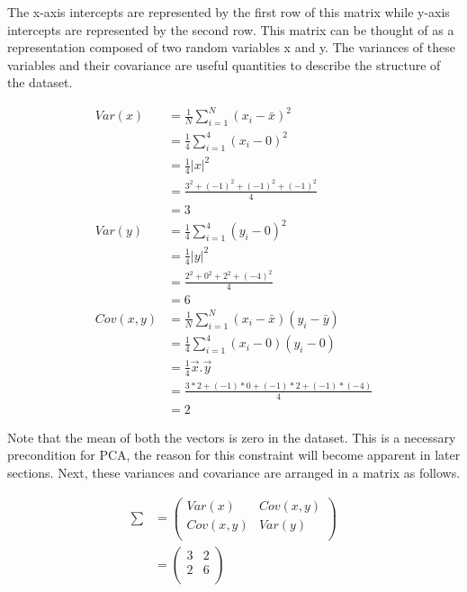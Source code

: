 \documentclass[11pt, a4paper]{article}
\begin{document}
The x-axis intercepts are represented by the first row of this matrix while y-axis intercepts are represented by the second row.
This matrix can be thought of as a representation composed of two random variables x and y. The variances of these variables and their covariance are useful quantities to describe the structure of the dataset.

\begin{align*}
	Var(x)    & = \frac{1}{N} \sum\limits_{i = 1}^N (x_i - \bar{x})^2              \\
	          & = \frac{1}{4} \sum\limits_{i = 1}^4 (x_i - 0)^2                    \\
	          & = \frac{1}{4} |x|^2                                                \\
	          & = \frac{3^2 + (-1)^ 2 + (-1)^2 + (-1)^2}{4}                        \\
	          & = 3                                                                \\
	Var(y)    & = \frac{1}{4} \sum\limits_{i = 1}^4 (y_i - 0)^2                    \\
	          & = \frac{1}{4} |y|^2                                                \\
	          & = \frac{2^2 + 0^ 2 + 2^2 + (-4)^2}{4}                              \\           
	          & = 6                                                                \\
	Cov(x, y) & = \frac{1}{N} \sum\limits_{i = 1}^N (x_i - \bar{x})(y_i - \bar{y}) \\
	          & = \frac{1}{4} \sum\limits_{i = 1}^4 (x_i - 0)(y_i - 0)             \\  
	          & = \frac{1}{4} \vec{x}.\vec{y}                                      \\
	          & = \frac{3*2 + (-1)*0 + (-1)*2 + (-1)*(-4)}{4}                      \\
	          & = 2                                                                
\end{align*}

Note that the mean of both the vectors is zero in the dataset. This is a necessary precondition for PCA, the reason for this constraint will become apparent in later sections. Next, these variances and covariance are arranged in a matrix as follows.

\begin{align*}
	\sum & = \begin{pmatrix} Var(x) & Cov(x, y) \\
	Cov(x, y) & Var(y) \\ 
	\end{pmatrix} \\
	     & = \begin{pmatrix} 3      & 2         \\
	2 & 6 \\ 
	\end{pmatrix}           
\end{align*}
\end{document}
